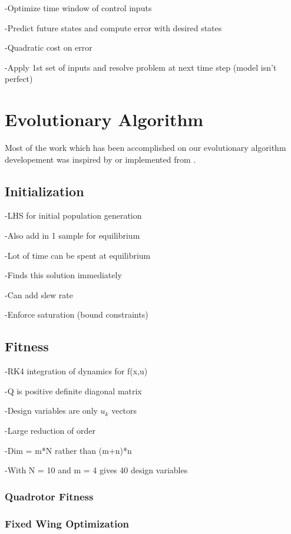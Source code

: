 \documentclass[letterpaper, 10 pt, conference]{ieeeconf}  %
\begin{document}
-Optimize time window of control inputs

-Predict future states and compute error with desired states

-Quadratic cost on error

-Apply 1st set of inputs and resolve problem at next time 
step (model isn't perfect)


\section{Evolutionary Algorithm}

Most of the work which has been accomplished on our evolutionary algorithm developement was inspired by or implemented from \cite{martins2017multidisciplinary}.

\subsection{Initialization}

-LHS for initial population generation

-Also add in 1 sample for equilibrium

-Lot of time can be spent at equilibrium

-Finds this solution immediately

-Can add slew rate

-Enforce saturation (bound constraints)


\subsection{Fitness}

-RK4 integration of dynamics for f(x,u)

-Q is positive definite diagonal matrix

-Design variables are only $u_k$ vectors

-Large reduction of order

-Dim = m*N rather than (m+n)*n

-With N = 10 and m = 4 gives 40 design variables



\subsubsection{Quadrotor Fitness}

\subsubsection{Fixed Wing Optimization}
\end{document}
